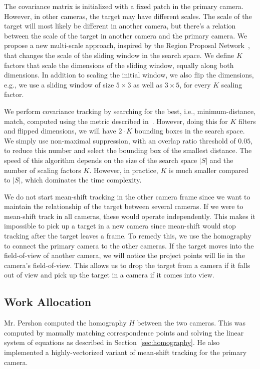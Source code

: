 \documentclass{article}
\begin{document}
The covariance matrix is initialized with a fixed patch in the primary camera. However, in other cameras, the target may have different scales. The scale of the target will most likely be different in another camera, but there's a relation between the scale of the target in another camera and the primary camera. We propose a new multi-scale approach, inspired by the Region Proposal Network~\cite{ren2015faster}, that changes the scale of the sliding window in the search space. We define $K$ factors that scale the dimensions of the sliding window, equally along both dimensions. In addition to scaling the initial window, we also flip the dimensions, e.g., we use a sliding window of size $5\times 3$ as well as $3\times 5$, for every $K$ scaling factor. 

We perform covariance tracking by searching for the best, i.e., minimum-distance, match, computed using the metric described in~\cite{forstner2003metric}. However, doing this for $K$ filters and flipped dimensions, we will have $2\cdot K$ bounding boxes in the search space. We simply use non-maximal suppression, with an overlap ratio threshold of $0.05$, to reduce this number and select the bounding box of the smallest distance. The speed of this algorithm depends on the size of the search space $|S|$ and the number of scaling factors $K$. However, in practice, $K$ is much smaller compared to $|S|$, which dominates the time complexity.

We do not start mean-shift tracking in the other camera frame since we want to maintain the relationship of the target between several cameras. If we were to mean-shift track in all cameras, these would operate independently. This makes it impossible to pick up a target in a new camera since mean-shift would stop tracking after the target leaves a frame. To remedy this, we use the homography to connect the primary camera to the other cameras. If the target moves into the field-of-view of another camera, we will notice the project points will lie in the camera's field-of-view. This allows us to drop the target from a camera if it falls out of view and pick up the target in a camera if it comes into view.

\subsection{Work Allocation}
Mr. Pershon computed the homography $H$ between the two cameras. This was computed by manually matching correspondence points and solving the linear system of equations as described in Section~\ref{sec:homography}. He also implemented a highly-vectorized variant of mean-shift tracking for the primary camera.
\end{document}
